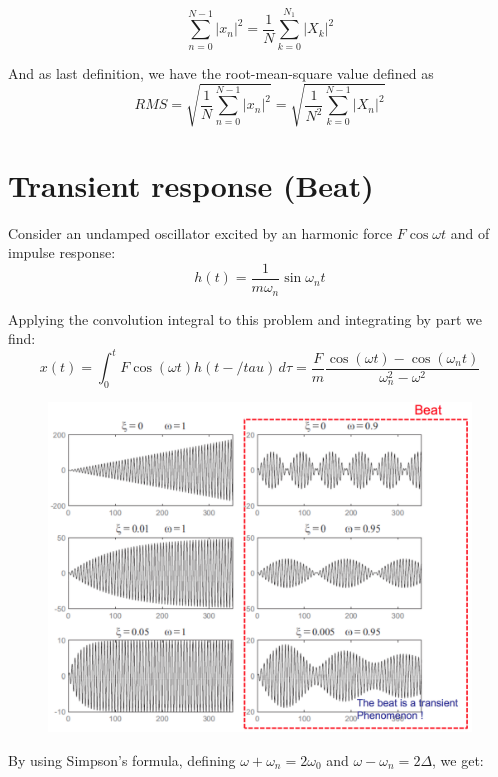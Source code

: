 			\begin{equation}
			\sum _{n=0}^{N-1}|x_n|^2 = \frac{1}{N} \sum _{k=0}^{N_1} |X_k|^2
			\end{equation}
			
			And as last definition, we have the root-mean-square value defined as 
			\begin{equation}
			RMS = \sqrt{\frac{1}{N}\sum _{n=0}^{N-1}|x_n|^2} = \sqrt{\frac{1}{N^2}\sum _{k=0}^{N-1}|X_n|^2}
			\end{equation}
			
			\section{Transient response (Beat)}
				Consider an undamped oscillator excited by an harmonic force $F\cos \omega t$ and of impulse response:
				\begin{equation}
				h(t) = \frac{1}{m\omega _n} \sin \omega _nt 
 				\end{equation}
 				
 				Applying the convolution integral to this problem and integrating by part we find:
 				\begin{equation}
 				x(t) = \int _0 ^t F\cos (\omega t) h(t-/tau ) \, d\tau = \frac{F}{m} \frac{\cos (\omega t) - \cos (\omega _n t)}{\omega _n ^2 - \omega ^2} 
 				\end{equation}
 				
 				\begin{figure}
				\vspace{-5mm}
				\includegraphics[scale=0.3]{vibration/ch1/12}
				\end{figure}
				By using Simpson's formula, defining $\omega + \omega _n = 2\omega _0$ and $\omega - \omega _n = 2\Delta$, we get:
 				
